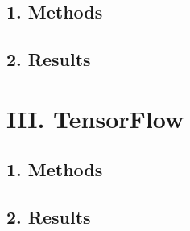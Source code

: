 \subsection*{\large 1. Methods}

\subsection*{\large 2. Results}

\newpage
\section*{\Large III. TensorFlow}

\subsection*{\large 1. Methods}

\subsection*{\large 2. Results}





\clearpage

%
%
%



